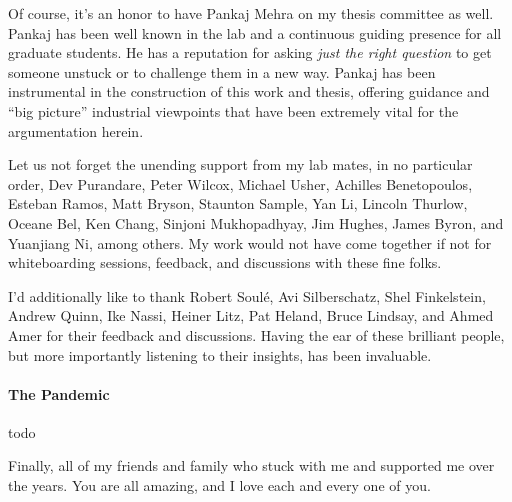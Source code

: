 Of course, it's an honor to have Pankaj Mehra on my thesis committee as well. Pankaj has been well known in the lab and
a continuous guiding presence for all graduate students. He has a reputation for asking \emph{just the right question}
to get someone unstuck or to challenge them in a new way. Pankaj has been instrumental in the construction of this work
and thesis, offering guidance and ``big picture'' industrial viewpoints that have been extremely vital for the
argumentation herein.

Let us not forget the unending support from my lab mates, in no particular order, Dev Purandare, Peter Wilcox, Michael Usher,
Achilles Benetopoulos, Esteban Ramos, Matt Bryson, Staunton Sample, Yan Li, Lincoln Thurlow, Oceane Bel, Ken Chang,
Sinjoni Mukhopadhyay, Jim Hughes, James Byron, and Yuanjiang Ni, among others. My work would not have come together if not for whiteboarding
sessions, feedback, and discussions with these fine folks.

I'd additionally like to thank Robert Soulé, Avi Silberschatz, Shel Finkelstein, Andrew Quinn, Ike Nassi, Heiner Litz,
Pat Heland, Bruce Lindsay, and Ahmed Amer for their feedback and discussions. Having the ear of these brilliant people,
but more importantly listening to their insights, has been invaluable.


\paragraph{The Pandemic}

todo




Finally, all of my friends and family who stuck with me and supported me over the years. You are all amazing, and I love each and
every one of you.



\endgroup
